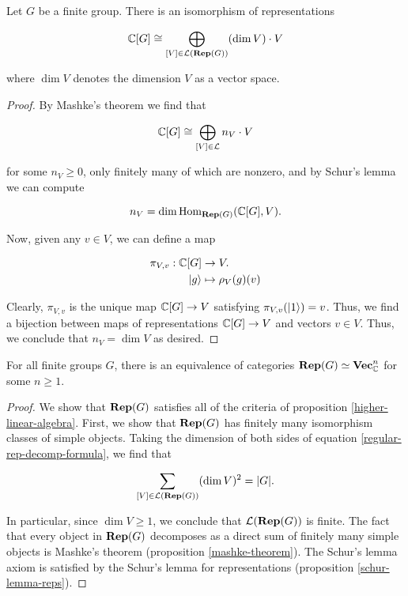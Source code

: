 \begin{lem}\label{regular-rep-decomp} Let $G$ be a finite group. There is an isomorphism of representations

\begin{equation}\label{regular-rep-decomp-formula}
{\mathbb C}[G]\cong \bigoplus_{[V]\in {\mathcal L}({\bf Rep}(G))}(\dim V)\cdot V
\end{equation}

where $\dim V$ denotes the dimension $V$ as a vector space.
\end{lem}
\begin{proof} By Mashke's theorem we find that

$${\mathbb C}[G]\cong \bigoplus_{[V]\in {\mathcal L}}n_V \cdot V$$

for some $n_V\geq 0$, only finitely many of which are nonzero, and by Schur's lemma we can compute

$$n_V=\dim \operatorname{Hom}_{{\bf Rep}(G)}({\mathbb C}[G],V).$$

Now, given any $v\in V$, we can define a map

\begin{align*}
\pi_{V,v}:{\mathbb C}[G]&\to V.\\
\ket{g}&\mapsto \rho_V(g)(v)
\end{align*}

Clearly, $\pi_{V,v}$ is the unique map ${\mathbb C}[G]\to V$ satisfying $\pi_{V,v}(\ket{1})=v$. Thus, we find a bijection between maps of representations ${\mathbb C}[G]\to V$ and vectors $v\in V$. Thus, we conclude that $n_V=\dim V$ as desired.

\end{proof}

\begin{cor}\label{repG-is-vector-space} For all finite groups $G$, there is an equivalence of categories ${\bf Rep}(G)\simeq  {\bf Vec}_{{\mathbb C}}^n$ for some $n\geq 1$.
\end{cor}
\begin{proof}We show that ${\bf Rep}(G)$ satisfies all of the criteria of proposition \ref{higher-linear-algebra}. First, we show that ${\bf Rep}(G)$ has finitely many isomorphism classes of simple objects. Taking the dimension of both sides of equation \ref{regular-rep-decomp-formula}, we find that

$$\sum_{[V]\in {\mathcal L}({\bf Rep}(G))}(\dim V)^2=|G|.$$

In particular, since $\dim V\geq 1$, we conclude that ${\mathcal L}({\bf Rep}(G))$ is finite. The fact that every object in ${\bf Rep}(G)$ decomposes as a direct sum of finitely many simple objects is Mashke's theorem (proposition \ref{mashke-theorem}). The Schur's lemma axiom is satisfied by the Schur's lemma for representations (proposition \ref{schur-lemma-reps}).
\end{proof}

